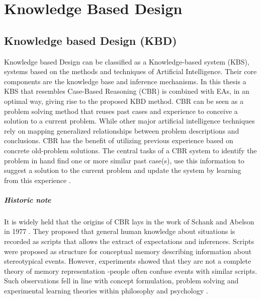 \chapter{Knowledge Based Design} %

\ifpdf
    \graphicspath{{2.5/figures/PNG/}{2.5/figures/PDF/}{2.5/figures/}}
\else
    \graphicspath{{2.5/figures/EPS/}{2.5/figures/}}
\fi


\section{Knowledge based Design (KBD)}
Knowledge based Design can be classified as a Knowledge-based system (KBS), systems based on the methods and techniques of Artificial Intelligence. Their core components are the knowledge base and inference mechanisms. In this thesis a KBS that resembles Case-Based Reasoning (CBR) is combined with EAs, in an optimal way, giving rise to the proposed KBD method. CBR can be seen as a problem solving method that 
reuses past cases and experience to conceive a solution to a current problem. 
While other major artificial intelligence techniques rely on mapping generalized 
relationships between problem descriptions and conclusions. CBR has the benefit 
of utilizing previous experience based on concrete old-problem solutions. 
The central tasks of a CBR system to identify the problem in hand find one or 
more similar past case(s), use this information to suggest a solution to the current 
problem and update the system by learning from this experience \cite{kolodner_1991,kolodner_1993,slade_1991,riesbeck_1989}.      

\paragraph{Historic note}
\label{History} It is widely held that the origins of CBR lays in the work of 
Schank and Abelson in 1977 \cite{Schank_Abelson_1977}. They proposed that general 
human knowledge about situations is recorded as scripts that allows the extract 
of expectations and inferences. Scripts were proposed as structure for conceptual 
memory describing information about stereotypical events. However, experiments 
showed that they are not a complete theory of memory representation -people 
often confuse events with similar scripts. Such observations fell in line with 
concept formulation, problem solving and experimental learning theories within 
philosophy and psychology \cite{tulving_1977,smith_1978}. 

